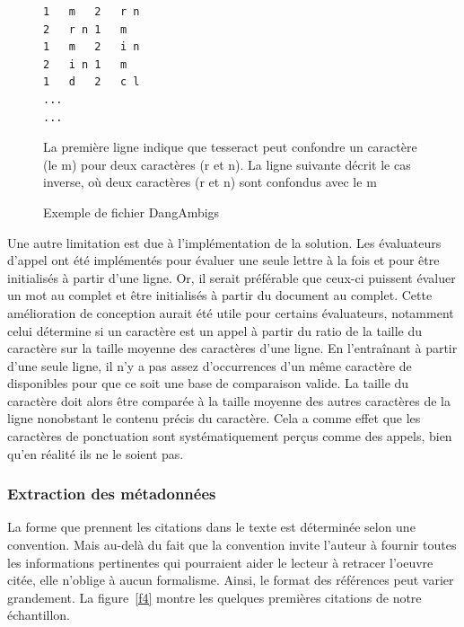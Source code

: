 \begin{figure}
\begin{lstlisting}
1	m	2	r n
2	r n	1	m
1	m	2	i n
2	i n	1	m
1	d	2	c l
...
...
\end{lstlisting}


\caption{Exemple de fichier DangAmbigs}{La première ligne indique que tesseract peut confondre un caractère (le m) pour deux caractères (r et n). La ligne suivante décrit le cas inverse, où deux caractères (r et n) sont confondus avec le m}
\label{figure-dangambigs}
\end{figure}
Une autre limitation est due à l'implémentation de la solution. Les évaluateurs d'appel ont été implémentés pour évaluer une seule lettre à la fois et pour être initialisés à partir d'une ligne. Or, il serait préférable que ceux-ci puissent évaluer un mot au complet et être initialisés à partir du document au complet. Cette amélioration de conception aurait été utile pour certains évaluateurs, notamment celui détermine si un caractère est un appel à partir du ratio de la taille du caractère sur la taille moyenne des caractères d'une ligne. En l'entraînant à partir d'une seule ligne, il n'y a pas assez d'occurrences d'un même caractère de disponibles pour que ce soit une base de comparaison valide. La taille du caractère doit alors être comparée à la taille moyenne des autres caractères de la ligne nonobstant le contenu précis du caractère. Cela a comme effet que les caractères de ponctuation sont systématiquement perçus comme des appels, bien qu'en réalité ils ne le soient pas.



\subsubsection{Extraction des métadonnées}
La forme que prennent les citations dans le texte est déterminée selon une convention. Mais au-delà du fait que la convention invite l'auteur à fournir toutes les informations pertinentes qui pourraient aider le lecteur à retracer l'oeuvre citée, elle n'oblige à aucun formalisme. Ainsi, le format des références peut varier grandement. La figure~\ref{f4} montre les quelques premières citations de notre échantillon.

